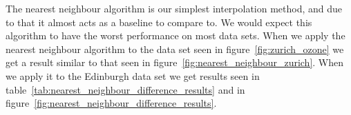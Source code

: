 
	        The nearest neighbour algorithm is our simplest interpolation method, and due to that it almost acts as a baseline to compare to. We would expect this algorithm to have the worst performance on most data sets. When we apply the nearest neighbour algorithm to the data set seen in figure~\ref{fig:zurich_ozone} we get a result similar to that seen in figure~\ref{fig:nearest_neighbour_zurich}. When we apply it to the Edinburgh data set we get results seen in table~\ref{tab:nearest_neighbour_difference_results} and in figure~\ref{fig:nearest_neighbour_difference_results}. 

